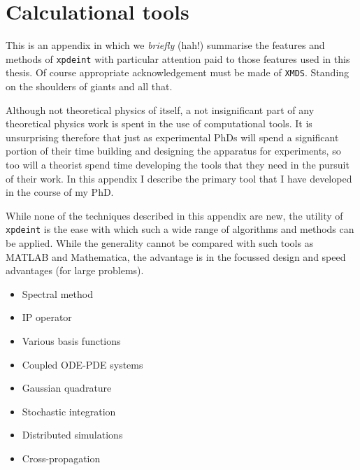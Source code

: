 \chapter{Calculational tools}
\label{ToolsAppendix}
\graphicspath{{Figures/ToolsAppendix/}{Figures/Common/}}

This is an appendix in which we \emph{briefly} (hah!) summarise the features and methods of \texttt{xpdeint} with particular attention paid to those features used in this thesis. Of course appropriate acknowledgement must be made of \texttt{XMDS}. Standing on the shoulders of giants and all that.

Although not theoretical physics of itself, a not insignificant part of any theoretical physics work is spent in the use of computational tools. It is unsurprising therefore that just as experimental PhDs will spend a significant portion of their time building and designing the apparatus for experiments, so too will a theorist spend time developing the tools that they need in the pursuit of their work. In this appendix I describe the primary tool that I have developed in the course of my PhD. %

While none of the techniques described in this appendix are new, the utility of \texttt{xpdeint} is the ease with which such a wide range of algorithms and methods can be applied. While the generality cannot be compared with such tools as MATLAB and Mathematica, the advantage is in the focussed design and speed advantages (for large problems).

\begin{itemize}
    \item Spectral method
    \item IP operator
    \item Various basis functions
    \item Coupled ODE-PDE systems
    \item Gaussian quadrature
    \item Stochastic integration
    \item Distributed simulations
    \item Cross-propagation
\end{itemize}